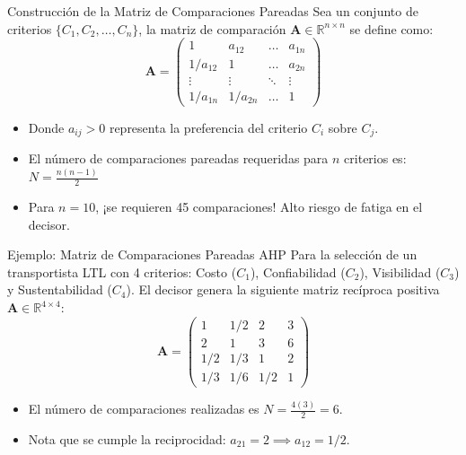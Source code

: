 \documentclass[aspectratio=169, 10pt]{beamer}
\begin{document}
\begin{frame}{Construcción de la Matriz de Comparaciones Pareadas}
    Sea un conjunto de criterios $\{C_1, C_2, \dots, C_n\}$, la matriz de comparación $\mathbf{A} \in \mathbb{R}^{n \times n}$ se define como:
    \[\mathbf{A} = \begin{pmatrix}
        1 & a_{12} & \dots & a_{1n} \\
        1/a_{12} & 1 & \dots & a_{2n} \\
        \vdots & \vdots & \ddots & \vdots \\
        1/a_{1n} & 1/a_{2n} & \dots & 1
    \end{pmatrix}\]
    \begin{itemize}
        \item Donde $a_{ij} > 0$ representa la preferencia del criterio $C_i$ sobre $C_j$.
        \item El número de comparaciones pareadas requeridas para $n$ criterios es:
              $N = \frac{n(n-1)}{2}$
        \item Para $n=10$, ¡se requieren 45 comparaciones! Alto riesgo de fatiga en el decisor.
    \end{itemize}
\end{frame}

\begin{frame}{Ejemplo: Matriz de Comparaciones Pareadas AHP}
    Para la selección de un transportista LTL con 4 criterios: Costo ($C_1$), Confiabilidad ($C_2$), Visibilidad ($C_3$) y Sustentabilidad ($C_4$).
    El decisor genera la siguiente matriz recíproca positiva $\mathbf{A} \in \mathbb{R}^{4 \times 4}$:
    \[\mathbf{A} = \begin{pmatrix}
        1 & 1/2 & 2 & 3 \\
        2 & 1 & 3 & 6 \\
        1/2 & 1/3 & 1 & 2 \\
        1/3 & 1/6 & 1/2 & 1
    \end{pmatrix}\]
    \begin{itemize}
        \item El número de comparaciones realizadas es $N = \frac{4(3)}{2} = 6$.
        \item Nota que se cumple la reciprocidad: $a_{21} = 2 \implies a_{12} = 1/2$.
    \end{itemize}
\end{frame}
\end{document}
